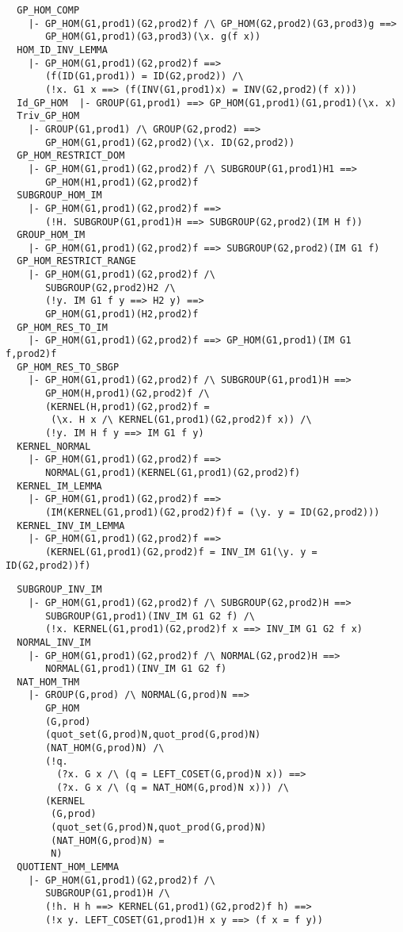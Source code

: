 \begin{verbatim}
  GP_HOM_COMP
    |- GP_HOM(G1,prod1)(G2,prod2)f /\ GP_HOM(G2,prod2)(G3,prod3)g ==>
       GP_HOM(G1,prod1)(G3,prod3)(\x. g(f x))
  HOM_ID_INV_LEMMA
    |- GP_HOM(G1,prod1)(G2,prod2)f ==>
       (f(ID(G1,prod1)) = ID(G2,prod2)) /\
       (!x. G1 x ==> (f(INV(G1,prod1)x) = INV(G2,prod2)(f x)))
  Id_GP_HOM  |- GROUP(G1,prod1) ==> GP_HOM(G1,prod1)(G1,prod1)(\x. x)
  Triv_GP_HOM
    |- GROUP(G1,prod1) /\ GROUP(G2,prod2) ==>
       GP_HOM(G1,prod1)(G2,prod2)(\x. ID(G2,prod2))
  GP_HOM_RESTRICT_DOM
    |- GP_HOM(G1,prod1)(G2,prod2)f /\ SUBGROUP(G1,prod1)H1 ==>
       GP_HOM(H1,prod1)(G2,prod2)f
  SUBGROUP_HOM_IM
    |- GP_HOM(G1,prod1)(G2,prod2)f ==>
       (!H. SUBGROUP(G1,prod1)H ==> SUBGROUP(G2,prod2)(IM H f))
  GROUP_HOM_IM
    |- GP_HOM(G1,prod1)(G2,prod2)f ==> SUBGROUP(G2,prod2)(IM G1 f)
  GP_HOM_RESTRICT_RANGE
    |- GP_HOM(G1,prod1)(G2,prod2)f /\
       SUBGROUP(G2,prod2)H2 /\
       (!y. IM G1 f y ==> H2 y) ==>
       GP_HOM(G1,prod1)(H2,prod2)f
  GP_HOM_RES_TO_IM
    |- GP_HOM(G1,prod1)(G2,prod2)f ==> GP_HOM(G1,prod1)(IM G1 f,prod2)f
  GP_HOM_RES_TO_SBGP
    |- GP_HOM(G1,prod1)(G2,prod2)f /\ SUBGROUP(G1,prod1)H ==>
       GP_HOM(H,prod1)(G2,prod2)f /\
       (KERNEL(H,prod1)(G2,prod2)f =
        (\x. H x /\ KERNEL(G1,prod1)(G2,prod2)f x)) /\
       (!y. IM H f y ==> IM G1 f y)
  KERNEL_NORMAL
    |- GP_HOM(G1,prod1)(G2,prod2)f ==>
       NORMAL(G1,prod1)(KERNEL(G1,prod1)(G2,prod2)f)
  KERNEL_IM_LEMMA
    |- GP_HOM(G1,prod1)(G2,prod2)f ==>
       (IM(KERNEL(G1,prod1)(G2,prod2)f)f = (\y. y = ID(G2,prod2)))
  KERNEL_INV_IM_LEMMA
    |- GP_HOM(G1,prod1)(G2,prod2)f ==>
       (KERNEL(G1,prod1)(G2,prod2)f = INV_IM G1(\y. y = ID(G2,prod2))f)
\end{verbatim}
\newpage
\begin{verbatim}
  SUBGROUP_INV_IM
    |- GP_HOM(G1,prod1)(G2,prod2)f /\ SUBGROUP(G2,prod2)H ==>
       SUBGROUP(G1,prod1)(INV_IM G1 G2 f) /\
       (!x. KERNEL(G1,prod1)(G2,prod2)f x ==> INV_IM G1 G2 f x)
  NORMAL_INV_IM
    |- GP_HOM(G1,prod1)(G2,prod2)f /\ NORMAL(G2,prod2)H ==>
       NORMAL(G1,prod1)(INV_IM G1 G2 f)
  NAT_HOM_THM
    |- GROUP(G,prod) /\ NORMAL(G,prod)N ==>
       GP_HOM
       (G,prod)
       (quot_set(G,prod)N,quot_prod(G,prod)N)
       (NAT_HOM(G,prod)N) /\
       (!q.
         (?x. G x /\ (q = LEFT_COSET(G,prod)N x)) ==>
         (?x. G x /\ (q = NAT_HOM(G,prod)N x))) /\
       (KERNEL
        (G,prod)
        (quot_set(G,prod)N,quot_prod(G,prod)N)
        (NAT_HOM(G,prod)N) =
        N)
  QUOTIENT_HOM_LEMMA
    |- GP_HOM(G1,prod1)(G2,prod2)f /\
       SUBGROUP(G1,prod1)H /\
       (!h. H h ==> KERNEL(G1,prod1)(G2,prod2)f h) ==>
       (!x y. LEFT_COSET(G1,prod1)H x y ==> (f x = f y))
\end{verbatim}
